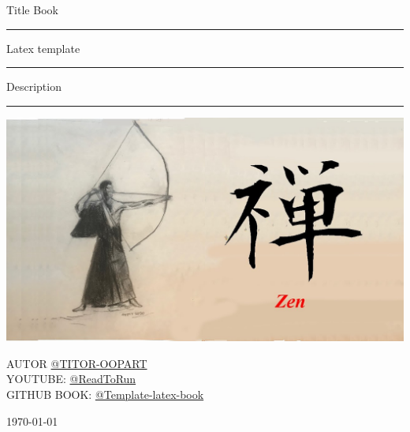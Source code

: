 \begin{titlepage}
	\noindent
	\centering
	\Large {Title Book}
	\begin{center}
		\centering
		\rule{150 mm}{0.1 mm}
		\Large {Latex template\\}
		
		\rule{150 mm}{0.1 mm}
		\large {{Description}}
		\rule{150 mm}{0.4 mm}
		\vspace{1 cm}
		\vspace{0.3 cm}
		\includegraphics[width=1\textwidth]{image/cover.jpg}
	\end{center}
	\vspace{0.3 cm}
	\begin{center}
		{\large AUTOR
			{\href{https://github.com/titor-oopart/}{@TITOR-OOPART}}}	\\
		{\large YOUTUBE:	{\href{https://www.youtube.com/@ReadToRun}{@ReadToRun}}}	\\
		{\large GITHUB BOOK:  	{\href{https://github.com/titor-oopart/latex_template_book}{@Template-latex-book}}}\\
	\end{center}
	\vspace{0.5 cm}
	\vfill
	\begin{center}
		\large\today
	\end{center}
\end{titlepage}
